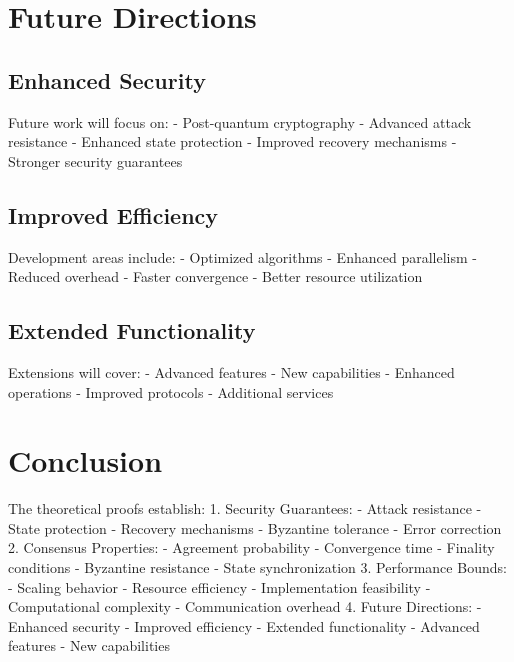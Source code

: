 \documentclass[12pt]{article}
\begin{document}
\section{Future Directions}
\subsection{Enhanced Security}
Future work will focus on:
- Post-quantum cryptography
- Advanced attack resistance
- Enhanced state protection
- Improved recovery mechanisms
- Stronger security guarantees
\subsection{Improved Efficiency}
Development areas include:
- Optimized algorithms
- Enhanced parallelism
- Reduced overhead
- Faster convergence
- Better resource utilization
\subsection{Extended Functionality}
Extensions will cover:
- Advanced features
- New capabilities
- Enhanced operations
- Improved protocols
- Additional services
\section{Conclusion}
The theoretical proofs establish:
1. Security Guarantees:
- Attack resistance
- State protection
- Recovery mechanisms
- Byzantine tolerance
- Error correction
2. Consensus Properties:
- Agreement probability
- Convergence time
- Finality conditions
- Byzantine resistance
- State synchronization
3. Performance Bounds:
- Scaling behavior
- Resource efficiency
- Implementation feasibility
- Computational complexity
- Communication overhead
4. Future Directions:
- Enhanced security
- Improved efficiency
- Extended functionality
- Advanced features
- New capabilities


\end{document}
